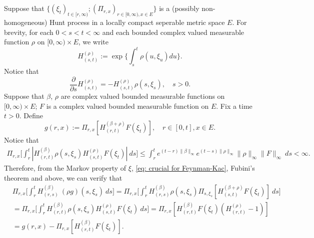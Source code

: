 \documentclass[12pt, a4paper]{amsart}
\theoremstyle{definition}
\numberwithin{equation}{section}
\begin{document}
\subsection{}
\label{seq: complex Feynman-Kac transform}
	Suppose that $\{(\xi_t)_{t \in [r,\infty)}; (\Pi_{r,x})_{r\in [0,\infty), x\in E}\}$ is a (possibly non-homogeneous) Hunt process in a locally compact seperable metric space $E$. 
	For brevity, for each $0< s< t< \infty$ and each bounded complex valued measurable function $\rho$ on $[0,\infty) \times E$, we write
\begin{equation}
	H^{(\rho)}_{(s,t)}:= \exp\Big\{\int_s^t \rho(u,\xi_u) du\Big\}.
\end{equation}
	Notice that
\begin{equation}
\label{eq: crucial for Feynman-Kac}
	\frac{\partial}{\partial s} H^{(\rho)}_{(s,t)}= -H^{(\rho)}_{(s,t)}\rho(s,\xi_s),
	\quad s> 0.
\end{equation}
	Suppose that $\beta$, $\rho$ are complex valued bounded measurable functions on $[0,\infty) \times E$; $F$ is a complex valued bounded measurable function on $E$.
    Fix a time $t >0$.  
	Define
\begin{equation}
	g(r,x) := \Pi_{r,x}[ H_{(r,t)}^{(\beta+\rho)} F(\xi_t)],\quad r \in [0,t], x\in E.
\end{equation}
    Notice that
\begin{align}
    \Pi_{r,x} \Big[ \int_r^t | H_{(r,t)}^{(\beta)}\rho(s,\xi_s) H_{(s,t)}^{(\rho)} F(\xi_t)| ~ds \Big] 
    \leq  \int_r^t e^{(t-r)\|\beta\|_\infty}e^{(t-s)\|\rho\|_\infty}\|\rho\|_\infty\|F\|_\infty ~ds 
    < \infty.
\end{align}
	Therefore, from the Markov property of $\xi$, \eqref{eq: crucial for Feynman-Kac}, Fubini's theorem and above, we can verify that
\begin{align}
	&\Pi_{r,x} \Big[ \int_r^tH_{(r,s)}^{(\beta)}~(\rho g)(s,\xi_s)~ds \Big]
	=\Pi_{r,x} \Big[ \int_r^t H_{(r,s)}^{(\beta)}\rho(s,\xi_s) \Pi_{s,\xi_s}[ H_{(s,t)}^{(\beta+\rho)} F(\xi_t)]~ds \Big]
	\\&= \Pi_{r,x} \Big[ \int_r^t H_{(r,t)}^{(\beta)}\rho(s,\xi_s) H_{(s,t)}^{(\rho)} F(\xi_t) ~ds \Big]
	= \Pi_{r,x} [ H_{(r,t)}^{(\beta)}F(\xi_t)(H_{(r,t)}^{(\rho)} - 1)]
	\\&= g(r,x) - \Pi_{r,x} [ H_{(r,t)}^{(\beta)} F(\xi_t)].
\end{align}
\end{document}
